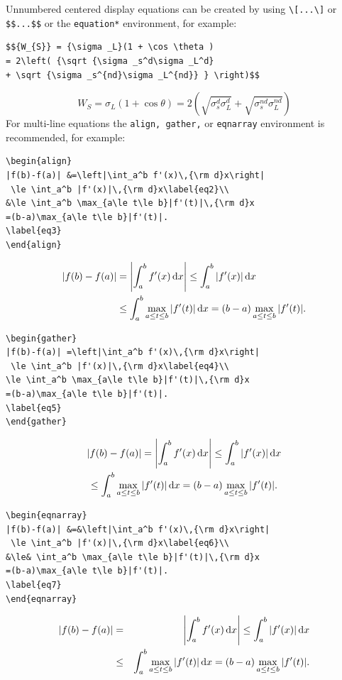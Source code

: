 \documentclass[11pt]{article}
\begin{document}
\noindent Unnumbered centered display equations can be created by using \verb|\[...\]| or \verb|$$...$$|
or the \verb|equation*| environment, for example:
\begin{verbatim}
$${W_{S}} = {\sigma _L}(1 + \cos \theta )
= 2\left( {\sqrt {\sigma _s^d\sigma _L^d}
+ \sqrt {\sigma _s^{nd}\sigma _L^{nd}} } \right)$$
\end{verbatim}
$${W_{S}} = {\sigma _L}(1 + \cos \theta ) = 2\left( {\sqrt {\sigma _s^d\sigma _L^d} + \sqrt {\sigma _s^{nd}\sigma _L^{nd}} } \right)$$
For multi-line equations the \verb|align, gather,| or \verb|eqnarray| environment is recommended, for example:
\begin{verbatim}
\begin{align}
|f(b)-f(a)| &=\left|\int_a^b f'(x)\,{\rm d}x\right|
 \le \int_a^b |f'(x)|\,{\rm d}x\label{eq2}\\
&\le \int_a^b \max_{a\le t\le b}|f'(t)|\,{\rm d}x
=(b-a)\max_{a\le t\le b}|f'(t)|.
\label{eq3}
\end{align}
\end{verbatim}
\begin{align}
|f(b)-f(a)| &=\left|\int_a^b f'(x)\,{\rm d}x\right|
 \le \int_a^b |f'(x)|\,{\rm d}x\label{eq2}\\
&\le \int_a^b \max_{a\le t\le b}|f'(t)|\,{\rm d}x
=(b-a)\max_{a\le t\le b}|f'(t)|.
\label{eq3}
\end{align}
\begin{verbatim}
\begin{gather}
|f(b)-f(a)| =\left|\int_a^b f'(x)\,{\rm d}x\right|
 \le \int_a^b |f'(x)|\,{\rm d}x\label{eq4}\\
\le \int_a^b \max_{a\le t\le b}|f'(t)|\,{\rm d}x
=(b-a)\max_{a\le t\le b}|f'(t)|.
\label{eq5}
\end{gather}
\end{verbatim}
\begin{gather}
|f(b)-f(a)| =\left|\int_a^b f'(x)\,{\rm d}x\right|
 \le \int_a^b |f'(x)|\,{\rm d}x\label{eq4}\\
\le \int_a^b \max_{a\le t\le b}|f'(t)|\,{\rm d}x
=(b-a)\max_{a\le t\le b}|f'(t)|.
\label{eq5}
\end{gather}
\begin{verbatim}
\begin{eqnarray}
|f(b)-f(a)| &=&\left|\int_a^b f'(x)\,{\rm d}x\right|
 \le \int_a^b |f'(x)|\,{\rm d}x\label{eq6}\\
&\le& \int_a^b \max_{a\le t\le b}|f'(t)|\,{\rm d}x
=(b-a)\max_{a\le t\le b}|f'(t)|.
\label{eq7}
\end{eqnarray}
\end{verbatim}
\begin{eqnarray}
|f(b)-f(a)| &=&\left|\int_a^b f'(x)\,{\rm d}x\right|
 \le \int_a^b |f'(x)|\,{\rm d}x\label{eq6}\\
&\le& \int_a^b \max_{a\le t\le b}|f'(t)|\,{\rm d}x=(b-a)\max_{a\le t\le b}|f'(t)|.
\label{eq7}
\end{eqnarray}
\end{document}
